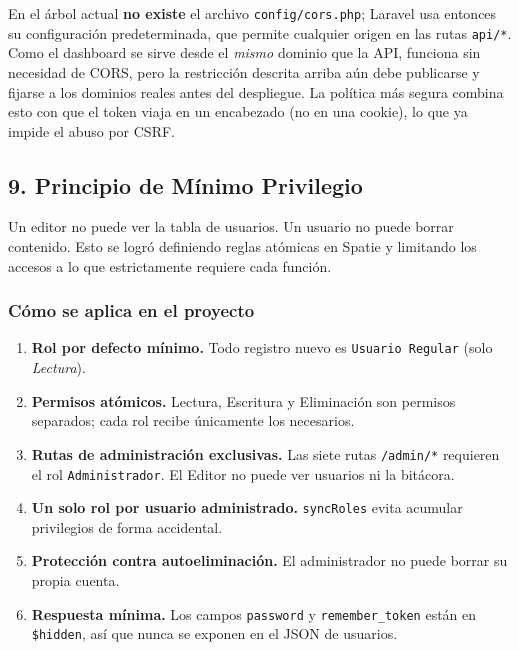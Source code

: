 \begin{aviso}
En el árbol actual \textbf{no existe} el archivo \texttt{config/cors.php}; Laravel usa entonces su configuración predeterminada, que permite cualquier origen en las rutas \texttt{api/*}. Como el dashboard se sirve desde el \emph{mismo} dominio que la API, funciona sin necesidad de CORS, pero la restricción descrita arriba aún debe publicarse y fijarse a los dominios reales antes del despliegue. La política más segura combina esto con que el token viaja en un encabezado (no en una cookie), lo que ya impide el abuso por CSRF.
\end{aviso}

\subsection{9. Principio de Mínimo Privilegio}
Un editor no puede ver la tabla de usuarios. Un usuario no puede borrar contenido. Esto se logró definiendo reglas atómicas en Spatie y limitando los accesos a lo que estrictamente requiere cada función.

\subsubsection{Cómo se aplica en el proyecto}
\begin{enumerate}
    \item \textbf{Rol por defecto mínimo.} Todo registro nuevo es \texttt{Usuario Regular} (solo \emph{Lectura}).
    \item \textbf{Permisos atómicos.} Lectura, Escritura y Eliminación son permisos separados; cada rol recibe únicamente los necesarios.
    \item \textbf{Rutas de administración exclusivas.} Las siete rutas \texttt{/admin/*} requieren el rol \texttt{Administrador}. El Editor no puede ver usuarios ni la bitácora.
    \item \textbf{Un solo rol por usuario administrado.} \texttt{syncRoles} evita acumular privilegios de forma accidental.
    \item \textbf{Protección contra autoeliminación.} El administrador no puede borrar su propia cuenta.
    \item \textbf{Respuesta mínima.} Los campos \texttt{password} y \texttt{remember\_token} están en \texttt{\$hidden}, así que nunca se exponen en el JSON de usuarios.
\end{enumerate}

